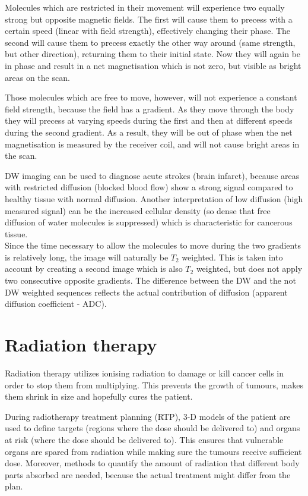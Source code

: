 Molecules which are restricted in their movement will experience two equally strong but opposite magnetic fields.
The first will cause them to precess with a certain speed (linear with field strength), effectively changing their phase.
The second will cause them to precess exactly the other way around (same strength, but other direction), returning them to their initial state.
Now they will again be in phase and result in a net magnetisation which is not zero, but visible as bright areas on the scan.

Those molecules which are free to move, however, will not experience a constant field strength, because the field has a gradient.
As they move through the body they will precess at varying speeds during the first and then at different speeds during the second gradient.
As a result, they will be out of phase when the net magnetisation is measured by the receiver coil, and will not cause bright areas in the scan.

DW imaging can be used to diagnose acute strokes (brain infarct), because areas with restricted diffusion (blocked blood flow) show a strong signal compared to healthy tissue with normal diffusion.
Another interpretation of low diffusion (high measured signal) can be the increased cellular density (so dense that free diffusion of water molecules is suppressed) which is characteristic for cancerous tissue.\\

Since the time necessary to allow the molecules to move during the two gradients is relatively long, the image will naturally be $T_2$ weighted.
This is taken into account by creating a second image which is also $T_2$ weighted, but does not apply two consecutive opposite gradients.
The difference between the DW and the not DW weighted sequences reflects the actual contribution of diffusion (apparent diffusion coefficient - ADC). \cite{McRobbie2006}


\section{Radiation therapy}
\label{sec:planning}
Radiation therapy utilizes ionising radiation to damage or kill cancer cells in order to stop them from multiplying.
This prevents the growth of tumours, makes them shrink in size and hopefully cures the patient. 

During radiotherapy treatment planning (RTP), 3-D models of the patient are used to define targets (regions where the dose should be delivered to) and organs at risk (where the dose should be delivered to).
This ensures that vulnerable organs are spared from radiation while making sure the tumours receive sufficient dose.
Moreover, methods to quantify the amount of radiation that different body parts absorbed are needed, because the actual treatment might differ from the plan.\\

